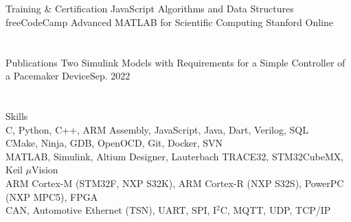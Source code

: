 \section{}{Training \& Certification\hspace{405pt}}
\resumeEntryStart
    \resumeEntryTSDL
      {JavaScript Algorithms and Data Structures}{}
      {freeCodeCamp}{}
    \resumeEntryTSDL
      {Advanced MATLAB for Scientific Computing}{}
      {Stanford Online}{}
\resumeEntryEnd

\section{}{Publications\hspace{463pt}}
\resumeEntryStart
    \resumeEntryTD
      {Two Simulink Models with Requirements for a Simple Controller of a Pacemaker Device}{Sep. 2022}
      \resumeItemListStart
      \resumeItemListEnd
      \resumeEntryEnd
\section{}{Skills\hspace{500pt}}
\resumeEntryStart
   {\\C, Python, C++, ARM Assembly, JavaScript, Java, Dart, Verilog, SQL}
   {\\CMake, Ninja, GDB, OpenOCD, Git, Docker, SVN}
   {\\MATLAB, Simulink, Altium Designer, Lauterbach TRACE32, STM32CubeMX, Keil $\mu$Vision}
   {\\ARM Cortex-M (STM32F, NXP S32K), ARM Cortex-R (NXP S32S), PowerPC (NXP MPC5), FPGA}
   {\\CAN, Automotive Ethernet (TSN), UART, SPI, I$^2$C, MQTT, UDP, TCP/IP}
\resumeEntryEnd
